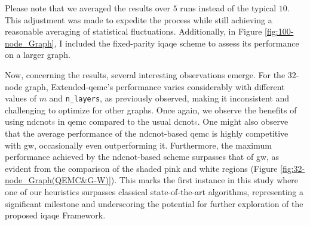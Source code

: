 


Please note that we averaged the results over $5$ runs instead of the typical $10$. This adjustment was made to expedite the process while still achieving a reasonable averaging of statistical fluctuations. Additionally, in Figure \ref{fig:100-node_Graph}, I included the fixed-parity \acrshort{iqaqe} scheme to assess its performance on a larger graph.

Now, concerning the results, several interesting observations emerge. For the $32$-node graph, Extended-\acrshort{qemc}'s performance varies considerably with different values of $m$ and \texttt{n\_layers}, as previously observed, making it inconsistent and challenging to optimize for other graphs. Once again, we observe the benefits of using \acrshort{ndcnot}\textcolor{gray}{s} in \acrshort{qemc} compared to the usual \acrshort{dcnot}\textcolor{gray}{s}. One might also observe that the average performance of the \acrshort{ndcnot}-based \acrshort{qemc} is highly competitive with \acrshort{gw}, occasionally even outperforming it. Furthermore, the maximum performance achieved by the \acrshort{ndcnot}-based scheme surpasses that of \acrshort{gw}, as evident from the comparison of the shaded pink and white regions (Figure \ref{fig:32-node_Graph(QEMC&G-W)}). This marks the first instance in this study where one of our heuristics surpasses classical state-of-the-art algorithms, representing a significant milestone and underscoring the potential for further exploration of the proposed \acrshort{iqaqe} Framework.

